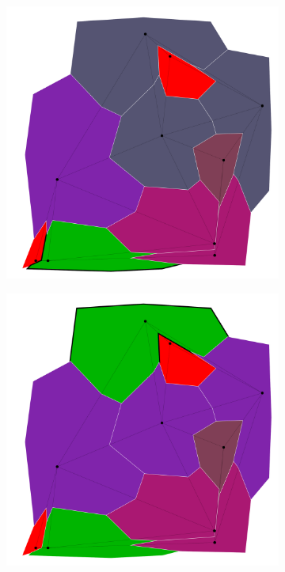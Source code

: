 \documentclass{article}
\begin{document}
\begin{figure}[h!]
\begin{subfigure}{0.18\textwidth}
				\caption{}
			\end{subfigure}
			\;
			\begin{subfigure}{0.18\textwidth}
				\centering
				\includegraphics[width=\textwidth]{images/sequences/mac_backtracking/bt_mac_I00006}
				\caption{}
			\end{subfigure}
			\;
			\begin{subfigure}{0.18\textwidth}
				\centering
				\includegraphics[width=\textwidth]{images/sequences/mac_backtracking/bt_mac_I00008}

\end{subfigure}
\end{figure}
\end{document}
